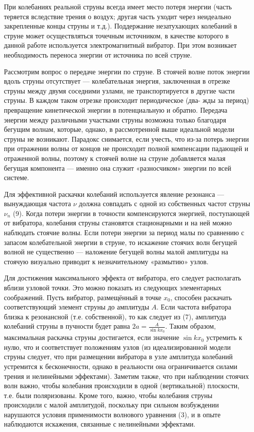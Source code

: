 \documentclass[14pt]{article}
\begin{document}
При колебаниях реальной струны всегда имеет место потеря энергии (часть теряется вследствие трения о воздух; другая часть уходит через неидеально закрепленные концы струны и т.д.). Поддержание незатухающих колебаний в струне может осуществляться точечным источником, в качестве которого в данной работе используется электромагнитный вибратор. При этом возникает необходимость переноса энергии от источника по всей струне.

Рассмотрим вопрос о передаче энергии по струне. В стоячей волне поток энергии вдоль струны отсутствует — колебательная энергия, заключенная
в отрезке струны между двумя соседними узлами, не транспортируется в другие части струны. В каждом таком отрезке происходит периодическое (два-
жды за период) превращение кинетической энергии в потенциальную и обратно. Передача энергии между различными участками струны возможна только благодаря бегущим волнам, которые, однако, в рассмотренной выше идеальной модели струны не возникают. Парадокс снимается, если учесть, что из-за потерь энергии при отражении волны от концов не происходит полной компенсации падающей и отраженной волны, поэтому к стоячей волне на струне добавляется малая бегущая компонента — именно она служит «разносчиком» энергии по всей системе. 

Для эффективной раскачки колебаний используется явление резонанса --- вынуждающая частота $\nu$ должна совпадать с одной из собственных частот струны $\nu_n$ (9). Когда потери энергии в точности компенсируются энергией, поступающей от вибратора, колебания струны становятся стационарными и на ней можно наблюдать стоячие волны. Если потери энергии за период малы по сравнению с запасом колебательной энергии в струне, то искажение стоячих волн бегущей волной не существенно --- наложение бегущей волны малой амплитуды на стоячую визуально приводит к незначительному «размытию» узлов.

Для достижения максимального эффекта от вибратора, его следует располагать вблизи узловой точки. Это можно показать из следующих элементарных соображений. Пусть вибратор, размещённый в точке $x_0$, способен раскачать соответствующий элемент струны до амплитуды $A$. Если частота вибратора близка к резонансной (т.е. собственной), то как следует из (7), амплитуда колебаний струны в пучности будет равна 
$2a = \frac{A}{\sin kx_0}$. Таким образом, максимальная раскачка струны достигается, если значение $\sin kx_0$ устремить к нулю, что и соответствует положениям узлов (из идеализированной модели струны следует, что при размещении вибратора в узле амплитуда колебаний устремится к бесконечности, однако в реальности она ограничивается силами трения и нелинейными эффектами). Заметим также, что при наблюдении стоячих волн важно, чтобы колебания происходили в одной (вертикальной) плоскости, т.е. были поляризованы. Кроме того, важно, чтобы колебания струны происходили с малой амплитудой, поскольку при сильном возбуждении нарушаются условия применимости волнового уравнения (3), и в опыте наблюдаются искажения, связанные с нелинейными эффектами. 
\end{document}
